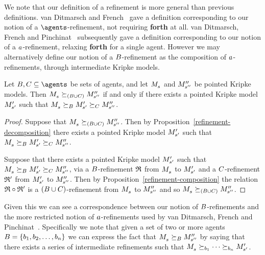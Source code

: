 We note that our definition of a refinement is more general than previous definitions.
van Ditmarsch and French~\cite{vanditmarsch:2009} gave a definition corresponding to our notion of a $\agents$-refinement, not requiring {\bf forth} at all.
van Ditmarsch, French and Pinchinat~\cite{vanditmarsch:2010} subsequently gave a definition corresponding to our notion of a $a$-refinement, relaxing {\bf forth} for a single agent.
However we may alternatively define our notion of a $B$-refinement as the composition of $a$-refinements, through intermediate Kripke models.

\begin{proposition}\label{refinement-agent-decomposition}
Let $\agentsB, \agentsC \subseteq \agents$ be sets of agents, and let $\kPModel{\kStateS}$ and ${M^{\prime\prime}_{{s}^{\prime\prime}}}$ be pointed Kripke models.
Then $\kPModel{\kStateS} \simulates[(\agentsB \cup \agentsC)] \kPModelPP{\kStateSPP}$ if and only if there exists a pointed Kripke model ${M^{\prime}_{{s}^{\prime}}}$ such that $\kPModel{\kStateS} \simulatesBs \kPModelP{\kStateSP} \simulatesCs \kPModelPP{\kStateSPP}$.
\end{proposition}

\begin{proof}
Suppose that $\kPModel{\kStateS} \simulates[(\agentsB \cup \agentsC)] \kPModelPP{\kStateSPP}$.
Then by Proposition~\ref{refinement-decomposition} there exists a pointed Kripke model ${M^{\prime}_{{s}^{\prime}}}$ such that $\kPModel{\kStateS} \simulatesBs \kPModelP{\kStateSP} \simulatesCs \kPModelPP{\kStateSPP}$.

Suppose that there exists a pointed Kripke model ${M^{\prime}_{{s}^{\prime}}}$ such that $\kPModel{\kStateS} \simulatesBs \kPModelP{\kStateSP} \simulatesCs \kPModelPP{\kStateSPP}$, via a $B$-refinement $\mathfrak{R}$ from $\kPModel{\kStateS}$ to ${M^{\prime}_{{s}^{\prime}}}$ and a $C$-refinement $\mathfrak{R}'$ from ${M^{\prime}_{{s}^{\prime}}}$ to ${M^{\prime\prime}_{{s}^{\prime\prime}}}$.
Then by Proposition~\ref{refinement-composition} the relation $\mathfrak{R} \circ \mathfrak{R}'$ is a $(B \cup C)$-refinement from $\kPModel{\kStateS}$ to ${M^{\prime\prime}_{{s}^{\prime\prime}}}$ and so $\kPModel{\kStateS} \simulates[(\agentsB \cup \agentsC)] \kPModelPP{\kStateSPP}$.
\end{proof}

Given this we can see a correspondence between our notion of $B$-refinements and the more restricted notion of $a$-refinements used by van Ditmarsch, French and Pinchinat~\cite{vanditmarsch:2010}.
Specifically we note that given a set of two or more agents $B = \{b_1, b_2, \dots, b_n\}$ we can express the fact that $\kPModel{\kStateS} \simulatesBs \kPModelPP{\kStateSPP}$ by saying that there exists a series of intermediate refinements such that $\kPModel{\kStateS} \simulates[\agentB_1] \cdots \simulates[\agentB_n] \kPModelP{\kStateSP}$.


